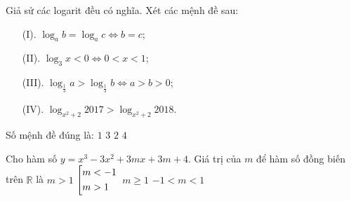 \begin{ex}%
Giả sử các logarit đều có nghĩa. Xét các mệnh đề sau:
\begin{enumerate}
\item[(I).] $\log_ab=\log_ac\Leftrightarrow b=c$;
\item[(II).] $\log_3x<0\Leftrightarrow 0<x<1$;
\item[(III).] $\log_{\tfrac{1	}{3}}a>\log_{\tfrac{1}{3}}b\Leftrightarrow a>b>0$;
\item[(IV).] $\log_{x^2+2}2017>\log_{x^2+2}2018$. 
\end{enumerate}
Số mệnh đề đúng là:
\choice
{$1$}
{$3$}
{\True $2$}
{$4$}
\end{ex}

\begin{ex}%
Cho hàm số $y=x^3-3x^2+3mx+3m+4$. Giá trị của $m$ để hàm số đồng biến trên $\mathbb{R}$ là
\choice
{$m>1$}
{$\left[\begin{aligned}&m<-1\\&m>1\end{aligned}\right.$}
{\True $m\geq 1$}
{$-1<m<1$}
\end{ex}


